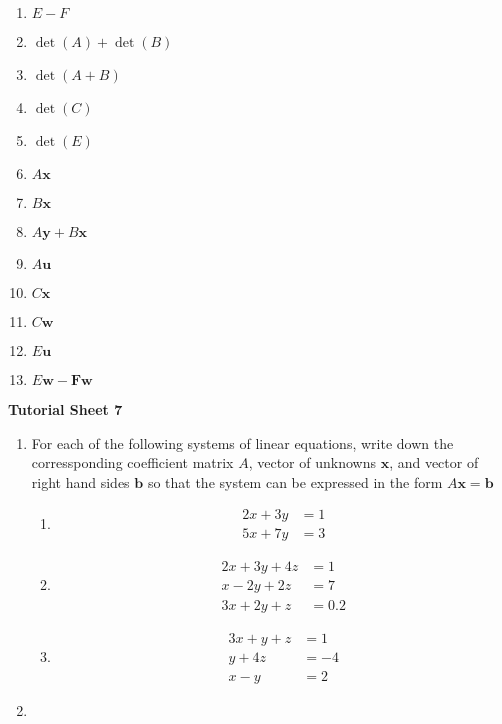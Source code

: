 \documentclass[11pt,a4paper,titlepage,oneside,openany]{article}
\numberwithin{equation}{section}
\numberwithin{algorithm}{section}
\numberwithin{figure}{section}
\numberwithin{table}{section}
\renewcommand{\vec}[1]{\mathbf{#1}}
\begin{document}
\begin{enumerate}
\begin{multicols}{3}
\begin{enumerate}
    \item $E-F$
    \item $\det(A)+\det(B)$
    \item $\det(A+B)$
    \item $\det(C)$
    \item $\det(E)$
    \item $A\vec{x}$
    \item $B\vec{x}$
    \item $A\vec{y}+B\vec{x}$
    \item $A\vec{u}$
    \item $C\vec{x}$
    \item $C\vec{w}$
    \item $E\vec{u}$
    \item $E\vec{w}-\vec{F}\vec{w}$

    \end{enumerate}
  \end{multicols}

\end{enumerate}
\pagebreak

\begin{center}
  \textbf{Tutorial Sheet 7}
\end{center}

\begin{enumerate}
\item
  For each of the following systems of linear equations, write down the corressponding coefficient matrix $A$, vector of unknowns $\vec{x}$, and vector of right hand sides $\vec{b}$ so that the system can be expressed in the form $A\vec{x}=\vec{b}$
  \begin{multicols}{3}
    \begin{enumerate}
      \item
        \begin{align*}
          2x+3y&=1\\
          5x+7y&=3
        \end{align*}
      \item\begin{align*}
          2x+3y+4z&=1\\
          x-2y+2z&=7\\
          3x+2y+z&=0.2
        \end{align*}
        \item
        \begin{align*}
          3x+y+z&=1\\
          y+4z&=-4\\
          x-y&=2
        \end{align*}
    \end{enumerate}
  \end{multicols}
\item
\end{enumerate}
\end{document}
